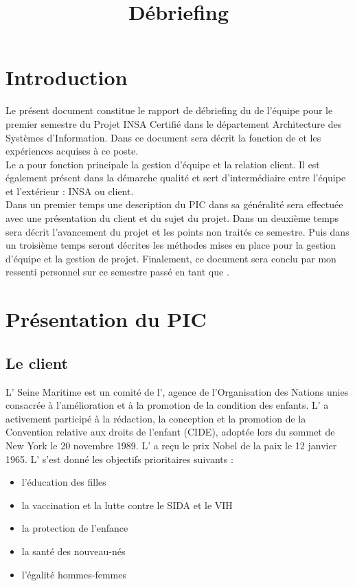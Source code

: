 \documentclass[asi]{picInsa}
\title{Débriefing \CP{}}
\author{\Sergi}
\begin{document}
\couverture{}

\informationsGenerales{}


\tableofcontents

\setcounter{chapter}{0}

\chapter{Introduction}
\label{Introduction}
Le présent document constitue le rapport de débriefing du \CP{} de l'équipe \nomEquipe{} pour le premier semestre du Projet INSA Certifié dans le département Architecture des Systèmes d'Information. Dans ce document sera décrit la fonction de \CP{} et les expériences acquises à ce poste.\vspace{0.5cm}\\
Le \CP{} a pour fonction principale la gestion d'équipe et la relation client. Il est également présent dans la démarche qualité et sert d'intermédiaire entre l'équipe et l'extérieur : INSA ou client.\vspace{0.5cm}\\
Dans un premier temps une description du PIC dans sa généralité sera effectuée avec une présentation du client et du sujet du projet. Dans un deuxième temps sera décrit l'avancement du projet et les points non traités ce semestre. Puis dans un troisième temps seront décrites les méthodes mises en place pour la gestion d'équipe et la gestion de projet. Finalement, ce document sera conclu par mon ressenti personnel sur ce semestre passé en tant que \CP.




\chapter{Présentation du PIC}
\label{presentation_PIC}
\section{Le client}
L'\nomClient{} Seine Maritime est un comité de l'\nomClient{},  agence de l'Organisation des Nations unies consacrée à l'amélioration et à la promotion de la condition des enfants.  L'\nomClient{} a activement participé à la rédaction, la conception et la promotion de la Convention relative aux droits de l'enfant (CIDE), adoptée lors du sommet de New York le 20 novembre 1989. L'\nomClient{} a reçu le prix Nobel de la paix le 12 janvier 1965. L'\nomClient{} s'est donné les objectifs prioritaires suivants :
\begin{itemize}
	\item l'éducation des filles
	\item la vaccination et la lutte contre le SIDA et le VIH
	\item la protection de l'enfance
	\item la santé des nouveau-nés
	\item l'égalité hommes-femmes\vspace{0.5cm}
\end{itemize}
\end{document}
